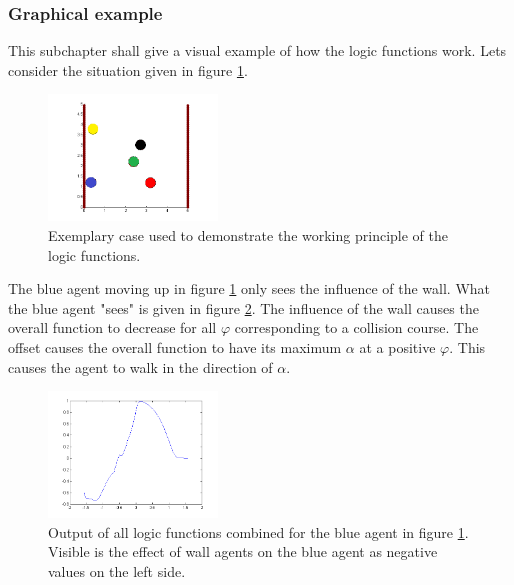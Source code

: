 \subsubsection{Graphical example}
This subchapter shall give a visual example of how the logic functions work. Lets consider the situation given in figure \ref{fig:Bsp1}.
\begin{figure}[h!]
	\centering
		\includegraphics[width=0.40\textwidth]{pictures/Bsp1}
	\caption{Exemplary case used to demonstrate the working principle of the logic functions.}
	\label{fig:Bsp1}
\end{figure}

\noi The blue agent moving up in figure \ref{fig:Bsp1} only sees the influence of the wall. What the blue agent "sees" is given in figure \ref{fig:Bsp1LinksUnten}. The influence of the wall causes the overall function to decrease for all $\varphi$ corresponding to a collision course. The offset causes the overall function to have its maximum $\alpha$ at a positive $\varphi$. This causes the agent to walk in the direction of $\alpha$.\\
\begin{figure}[h!]
	\centering
		\includegraphics[width=0.40\textwidth]{pictures/Bsp1LinksUnten}
	\caption{Output of all logic functions combined for the blue agent in figure \ref{fig:Bsp1}. Visible is the effect of wall agents on the blue agent as negative values on the left side.}
	\label{fig:Bsp1LinksUnten}
\end{figure}

